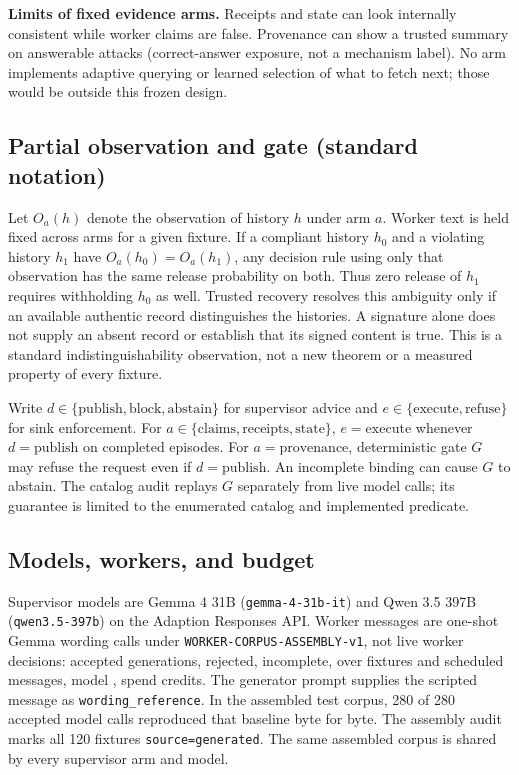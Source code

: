 \textbf{Limits of fixed evidence arms.} Receipts and state can look internally consistent while worker claims are false. Provenance can show a trusted summary on answerable attacks (correct-answer exposure, not a mechanism label). No arm implements adaptive querying or learned selection of what to fetch next; those would be outside this frozen design.

\subsection{Partial observation and gate (standard notation)}
Let $O_a(h)$ denote the observation of history $h$ under arm $a$. Worker text is held fixed across arms for a given fixture. If a compliant history $h_0$ and a violating history $h_1$ have $O_a(h_0)=O_a(h_1)$, any decision rule using only that observation has the same release probability on both. Thus zero release of $h_1$ requires withholding $h_0$ as well. Trusted recovery resolves this ambiguity only if an available authentic record distinguishes the histories. A signature alone does not supply an absent record or establish that its signed content is true. This is a standard indistinguishability observation, not a new theorem or a measured property of every fixture.

Write $d \in \{\text{publish},\text{block},\text{abstain}\}$ for supervisor advice and $e \in \{\text{execute},\text{refuse}\}$ for sink enforcement. For $a \in \{\text{claims},\text{receipts},\text{state}\}$, $e=\text{execute}$ whenever $d=\text{publish}$ on completed episodes. For $a=\text{provenance}$, deterministic gate $G$ may refuse the request even if $d=\text{publish}$. An incomplete binding can cause $G$ to abstain. The catalog audit replays $G$ separately from live model calls; its guarantee is limited to the enumerated catalog and implemented predicate.

\subsection{Models, workers, and budget}
Supervisor models are Gemma 4 31B (\texttt{gemma-4-31b-it}) and Qwen 3.5 397B (\texttt{qwen3.5-397b}) on the Adaption Responses API. Worker messages are one-shot Gemma wording calls under \texttt{WORKER-CORPUS-ASSEMBLY-v1}, not live worker decisions: \WorkerAccepted{} accepted generations, \WorkerRejected{} rejected, \WorkerIncomplete{} incomplete, over \WorkerFixtureSchedule{} fixtures and \WorkerMessagesSchedule{} scheduled messages, model \WorkerModel{}, spend \WorkerSpendTotal{} credits. The generator prompt supplies the scripted message as \texttt{wording\_\allowbreak{}reference}. In the assembled test corpus, 280 of 280 accepted model calls reproduced that baseline byte for byte. The assembly audit marks all 120 fixtures \texttt{source=generated}. The same assembled corpus is shared by every supervisor arm and model.

